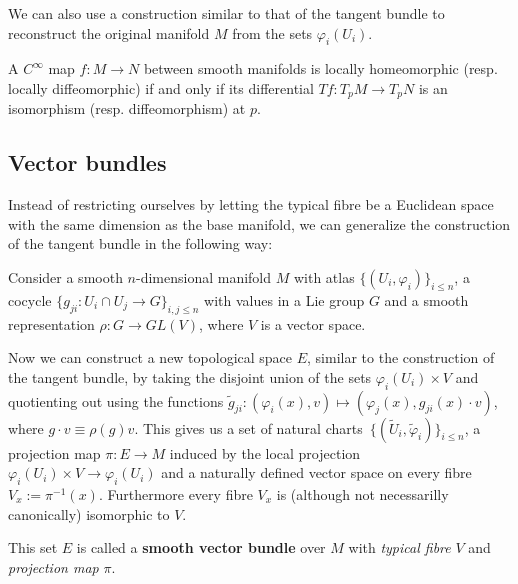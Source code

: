 	\begin{remark*}
		We can also use a construction similar to that of the tangent bundle to reconstruct the original manifold $M$ from the sets $\varphi_i(U_i)$.
	\end{remark*}
	
	
	\begin{theorem}\label{manifolds:theorem:inverse_function_theorem}
		A $C^\infty$ map $f:M\rightarrow N$ between smooth manifolds is locally homeomorphic (resp. locally diffeomorphic) if and only if its differential $Tf:T_pM\rightarrow T_pN$ is an isomorphism (resp. diffeomorphism) at $p$.
	\end{theorem}

\subsection{Vector bundles}

	Instead of restricting ourselves by letting the typical fibre be a Euclidean space with the same dimension as the base manifold, we can generalize the construction of the tangent bundle in the following way:
		
	\begin{construct}
		\label{manifolds:vector_bundle_construction}
		Consider a smooth $n$-dimensional manifold $M$ with atlas $\{(U_i, \varphi_i)\}_{i\leq n}$, a cocycle $\{g_{ji}: U_i\cap U_j\rightarrow G\}_{i,j\leq n}$ with values in a Lie group $G$ and a smooth representation $\rho:G\rightarrow GL(V)$, where $V$ is a vector space.
		
		Now we can construct a new topological space $E$, similar to the construction of the tangent bundle, by taking the disjoint union of the sets $\varphi_i(U_i)\times V$ and quotienting out using the functions $\widetilde{g}_{ji}:(\varphi_i(x), v)\mapsto(\varphi_j(x), g_{ji}(x)\cdot v)$, where $g\cdot v\equiv \rho(g)v$. This gives us a set of natural charts\footnotemark\ $\{(\widetilde{U}_i, \widetilde{\varphi}_i)\}_{i\leq n}$, a projection map $\pi:E\rightarrow M$ induced by the local projection $\varphi_i(U_i)\times V\rightarrow\varphi_i(U_i)$ and a naturally defined vector space on every fibre $V_x:=\pi^{-1}(x)$. Furthermore every fibre $V_x$ is (although not necessarilly canonically) isomorphic to $V$.
		
		This set $E$ is called a \textbf{smooth vector bundle} over $M$ with \textit{typical fibre} $V$ and \textit{projection map} $\pi$.
	\end{construct}

